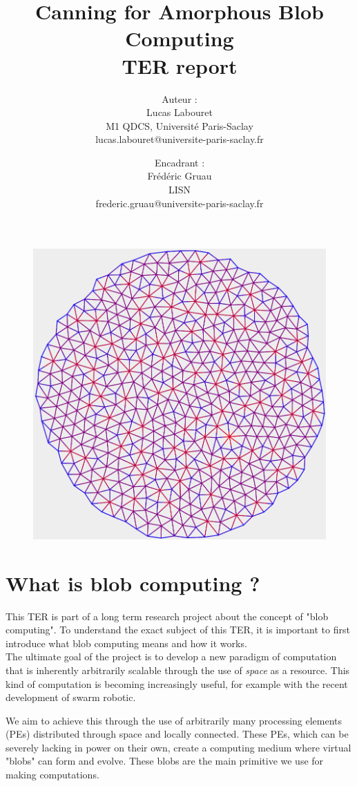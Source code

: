 \documentclass{article}
\title{
	Canning for Amorphous Blob Computing\\
	\small TER report
}
\author{
    Auteur :\\
    Lucas Labouret\\
    M1 QDCS, Université Paris-Saclay\\
    \small lucas.labouret@universite-paris-saclay.fr
    \and
    Encadrant :\\
    Frédéric Gruau\\
    LISN\\
    \small frederic.gruau@universite-paris-saclay.fr
}
\date{}
\begin{document}
 
\maketitle

\begin{figure}[H]
	\centering\includegraphics[width=0.9\linewidth]{assets/Circle500.png}
\end{figure}

\newpage
\tableofcontents
\newpage

\renewcommand{\thesection}{\Alph{section}}

\section{What is blob computing ?}

This TER is part of a long term research project about the concept of "blob computing"\cite{blob_computing}. To understand the exact subject of this TER, it is important to first introduce what blob computing means and how it works.\\

The ultimate goal of the project is to develop a new paradigm of computation that is inherently arbitrarily scalable through the use of \textit{space} as a resource. This kind of computation is becoming increasingly useful, for example with the recent development of swarm robotic\cite{swarm_robotic}.

We aim to achieve this through the use of arbitrarily many processing elements (PEs) distributed through space and locally connected. These PEs, which can be severely lacking in power on their own, create a computing medium where virtual "blobs" can form and evolve. These blobs are the main primitive we use for making computations.
\end{document}

